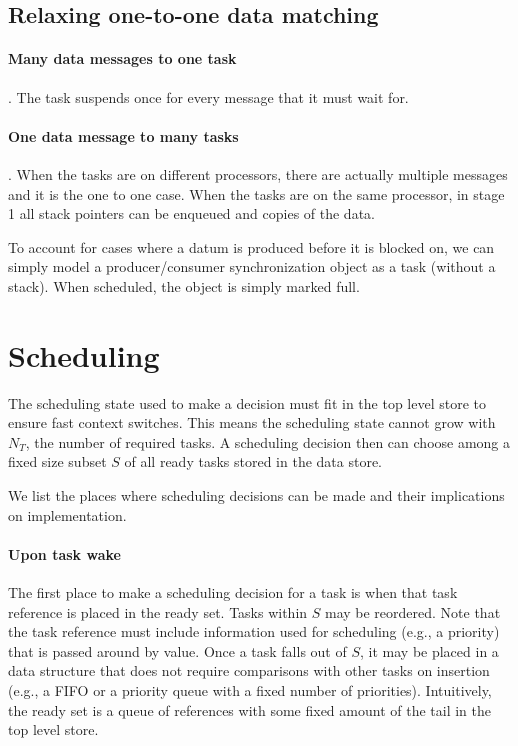 \subsection{Relaxing one-to-one data matching}

\paragraph{Many data messages to one task}. The task
suspends once for every message that it must wait for.

\paragraph{One data message to many tasks}. When the tasks are on different
processors, there are actually multiple messages and it is the one to
one case. When the tasks are on the same processor, in stage 1 all
stack pointers can be enqueued and copies of the data.

To account for cases where a datum is produced before it is blocked
on, we can simply model a producer/consumer synchronization object as
a task (without a stack). When scheduled, the object is simply marked full. 


\section{Scheduling}

The scheduling state used to make a decision must fit in the top level
store to ensure fast context switches. This means the scheduling state
cannot grow with $N_T$, the number of required tasks. A scheduling
decision then can choose among a fixed size subset $S$ of all ready
tasks stored in the data store.

We list the places where scheduling decisions can be made and their 
implications on implementation.

\paragraph{Upon task wake}
The first place to make a scheduling decision for a task is when that
task reference is placed in the ready set. Tasks within $S$ may be
reordered. Note that the task reference must include information used for scheduling
(e.g., a priority) that is passed around by value. Once a task falls
out of $S$, it may be placed in a data structure that
does not require comparisons with other tasks on insertion (e.g., a
FIFO or a priority queue with a fixed number of priorities).
Intuitively, the ready set is a queue of references with some fixed amount of the tail in the top level
store.

